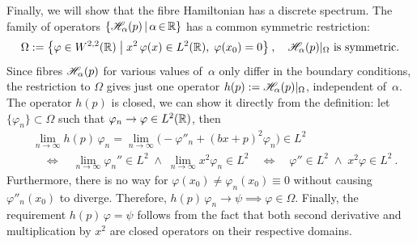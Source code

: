 Finally, we will show that the fibre Hamiltonian has a discrete spectrum. The family of operators $\{  \mathscr{H}_\alpha(p) \, | \, \alpha {\,\in\,} \mathbb{R} \}$ has a common symmetric restriction:
\begin{gather*}
    \Omega := \big\{
        \varphi \in W^{2,2}(\mathbb{R}) \;\big|\;
        x^2 \, \varphi(x) \in L^2(\mathbb{R}), \;
        \varphi(x_0) = 0
    \big\}
    \: ,
    \quad
    \mathscr{H}_\alpha(p) |_\Omega
    \text{ is symmetric.}
\end{gather*}
Since fibres $\mathscr{H}_\alpha(p)$ for various values of~$\alpha$ only differ in the boundary conditions, the restriction to $\Omega$ gives just one operator $h(p) := \mathscr{H}_\alpha(p) |_\Omega$, independent of~$\alpha$. The operator $h(p)$ is closed, we can show it directly from the definition: let $\{ \varphi_n \} \subset \Omega$ such that $\varphi_n \to \varphi \in L^2(\mathbb{R})$, then
\begin{align*}
    &\lim_{n\to\infty} h(p) \, \varphi_n
    = \lim_{n\to\infty} \big( -\varphi''_n + (bx+p)^2 \varphi_n \big)
    \in L^2
    \\[5pt]
    &\quad\Longleftrightarrow\quad
    \lim_{n\to\infty} \varphi_n'' \in L^2
    \;\wedge\;
    \lim_{n\to\infty} x^2 \varphi_n \in L^2
    \quad\Longleftrightarrow\quad
    \varphi'' \in L^2
    \;\wedge\;
    x^2 \varphi  \in L^2
    \: .
\end{align*}
Furthermore, there is no way for $\varphi(x_0) \neq \varphi_n(x_0) \equiv 0$ without causing $\varphi''_n(x_0)$ to diverge. Therefore, $h(p) \, \varphi_n \to \psi \implies \varphi \in \Omega$. Finally, the requirement $h(p) \, \varphi = \psi$ follows from the fact that both second derivative and multiplication by $x^2$ are closed operators on their respective domains.

